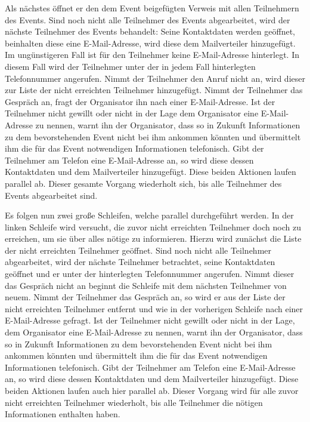 Als nächstes öffnet er den dem Event beigefügten Verweis mit allen Teilnehmern des Events. Sind noch nicht alle Teilnehmer des Events abgearbeitet, wird der nächste Teilnehmer des Events behandelt: Seine Kontaktdaten werden geöffnet, beinhalten diese eine E-Mail-Adresse, wird diese dem Mailverteiler hinzugefügt. Im ungünstigeren Fall ist für den Teilnehmer keine E-Mail-Adresse hinterlegt. In diesem Fall wird der Teilnehmer unter der in jedem Fall hinterlegten Telefonnummer angerufen. Nimmt der Teilnehmer den Anruf nicht an, wird dieser zur Liste der nicht erreichten Teilnehmer hinzugefügt. Nimmt der Teilnehmer das Gespräch an, fragt der Organisator ihn nach einer E-Mail-Adresse. Ist der Teilnehmer nicht gewillt oder nicht in der Lage dem Organisator eine E-Mail-Adresse zu nennen, warnt ihn der Organisator, dass so in Zukunft Informationen zu dem bevorstehenden Event nicht bei ihm ankommen könnten und übermittelt ihm die für das Event notwendigen Informationen telefonisch. Gibt der Teilnehmer am Telefon eine E-Mail-Adresse an, so wird diese dessen Kontaktdaten und dem Mailverteiler hinzugefügt. Diese beiden Aktionen laufen parallel ab. Dieser gesamte Vorgang wiederholt sich, bis alle Teilnehmer des Events abgearbeitet sind.

Es folgen nun zwei große Schleifen, welche parallel durchgeführt werden. In der linken Schleife wird versucht, die zuvor nicht erreichten Teilnehmer doch noch zu erreichen, um sie über alles nötige zu informieren. Hierzu wird zunächst die Liste der nicht erreichten Teilnehmer geöffnet. Sind noch nicht alle Teilnehmer abgearbeitet, wird der nächste Teilnehmer betrachtet, seine Kontaktdaten geöffnet und er unter der hinterlegten Telefonnummer angerufen. Nimmt dieser das Gespräch nicht an beginnt die Schleife mit dem nächsten Teilnehmer von neuem. Nimmt der Teilnehmer das Gespräch an, so wird er aus der Liste der nicht erreichten Teilnehmer entfernt und wie in der vorherigen Schleife nach einer E-Mail-Adresse gefragt. Ist der Teilnehmer nicht gewillt oder nicht in der Lage, dem Organisator eine E-Mail-Adresse zu nennen, warnt ihn der Organisator, dass so in Zukunft Informationen zu dem bevorstehenden Event nicht bei ihm ankommen könnten und übermittelt ihm die für das Event notwendigen Informationen telefonisch. Gibt der Teilnehmer am Telefon eine E-Mail-Adresse an, so wird diese dessen Kontaktdaten und dem Mailverteiler hinzugefügt. Diese beiden Aktionen laufen auch hier parallel ab. Dieser Vorgang wird für alle zuvor nicht erreichten Teilnehmer wiederholt, bis alle Teilnehmer die nötigen Informationen enthalten haben.

